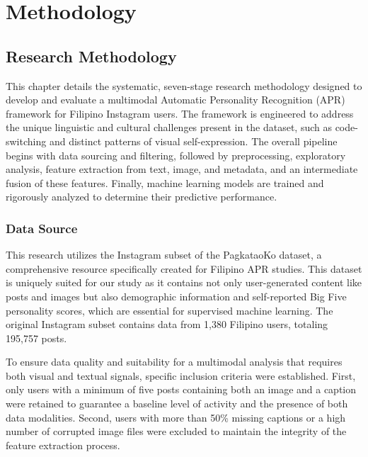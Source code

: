 \chapter{Methodology}
\label{sec:methodology}

\section{Research Methodology}
This chapter details the systematic, seven-stage research methodology designed to develop and evaluate a multimodal Automatic Personality Recognition (APR) framework for Filipino Instagram users. The framework is engineered to address the unique linguistic and cultural challenges present in the dataset, such as code-switching and distinct patterns of visual self-expression. The overall pipeline begins with data sourcing and filtering, followed by preprocessing, exploratory analysis, feature extraction from text, image, and metadata, and an intermediate fusion of these features. Finally, machine learning models are trained and rigorously analyzed to determine their predictive performance.

\subsection{Data Source}
\label{subsec:data}
This research utilizes the Instagram subset of the PagkataoKo dataset, a comprehensive resource specifically created for Filipino APR studies. This dataset is uniquely suited for our study as it contains not only user-generated content like posts and images but also demographic information and self-reported Big Five personality scores, which are essential for supervised machine learning. The original Instagram subset contains data from 1,380 Filipino users, totaling 195,757 posts.

To ensure data quality and suitability for a multimodal analysis that requires both visual and textual signals, specific inclusion criteria were established. First, only users with a minimum of five posts containing both an image and a caption were retained to guarantee a baseline level of activity and the presence of both data modalities. Second, users with more than 50\% missing captions or a high number of corrupted image files were excluded to maintain the integrity of the feature extraction process.

